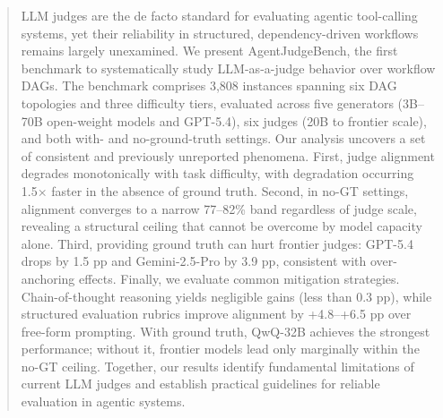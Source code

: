 \begin{abstract}
LLM judges are the de facto standard for evaluating agentic tool-calling systems, yet their reliability in structured, dependency-driven workflows remains largely unexamined. We present AgentJudgeBench, the first benchmark to systematically study LLM-as-a-judge behavior over workflow DAGs. The benchmark comprises 3,808 instances spanning six DAG topologies and three difficulty tiers, evaluated across five generators (3B–70B open-weight models and GPT-5.4), six judges (20B to frontier scale), and both with- and no-ground-truth settings.
Our analysis uncovers a set of consistent and previously unreported phenomena. First, judge alignment degrades monotonically with task difficulty, with degradation occurring 1.5× faster in the absence of ground truth. Second, in no-GT settings, alignment converges to a narrow 77–82\% band regardless of judge scale, revealing a structural ceiling that cannot be overcome by model capacity alone. Third, providing ground truth can hurt frontier judges: GPT-5.4 drops by 1.5 pp and Gemini-2.5-Pro by 3.9 pp, consistent with over-anchoring effects.
Finally, we evaluate common mitigation strategies. Chain-of-thought reasoning yields negligible gains (less than 0.3 pp), while structured evaluation rubrics improve alignment by +4.8–+6.5 pp over free-form prompting. With ground truth, QwQ-32B achieves the strongest performance; without it, frontier models lead only marginally within the no-GT ceiling.
Together, our results identify fundamental limitations of current LLM judges and establish practical guidelines for reliable evaluation in agentic systems.
\end{abstract}